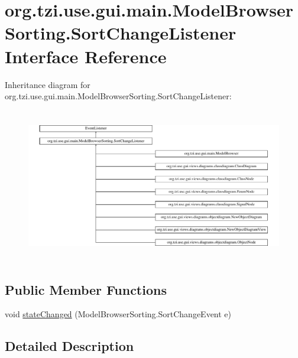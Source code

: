 \hypertarget{interfaceorg_1_1tzi_1_1use_1_1gui_1_1main_1_1_model_browser_sorting_1_1_sort_change_listener}{\section{org.\-tzi.\-use.\-gui.\-main.\-Model\-Browser\-Sorting.\-Sort\-Change\-Listener Interface Reference}
\label{interfaceorg_1_1tzi_1_1use_1_1gui_1_1main_1_1_model_browser_sorting_1_1_sort_change_listener}
}
Inheritance diagram for org.\-tzi.\-use.\-gui.\-main.\-Model\-Browser\-Sorting.\-Sort\-Change\-Listener\-:\begin{figure}[H]
\begin{center}
\leavevmode
\includegraphics[height=6.746988cm]{interfaceorg_1_1tzi_1_1use_1_1gui_1_1main_1_1_model_browser_sorting_1_1_sort_change_listener}
\end{center}
\end{figure}
\subsection*{Public Member Functions}
\begin{DoxyCompactItemize}
\item 
void \hyperlink{interfaceorg_1_1tzi_1_1use_1_1gui_1_1main_1_1_model_browser_sorting_1_1_sort_change_listener_a99aeeaf6bd5698e5840b1e9414054f34}{state\-Changed} (Model\-Browser\-Sorting.\-Sort\-Change\-Event e)
\end{DoxyCompactItemize}


\subsection{Detailed Description}


